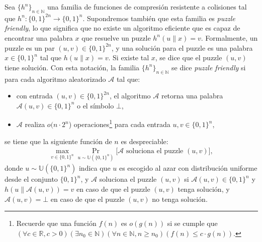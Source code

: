 
Sea $\{h^n\}_{n \in \mathbb{N}}$ una familia de funciones de
compresión resistente a colisiones tal que $h^n
: \{0,1\}^{2n} \to \{0,1\}^{n}$. Supondremos también que esta
familia es \textit{puzzle friendly}, lo que significa que no existe un
algoritmo eficiente que es capaz de encontrar una palabra $x$ que resuelve un puzzle
$h^n(u \| x) = v$. Formalmente, un puzzle es un par $(u, v) \in \{0,1\}^{2n}$, y una solución para el puzzle es una palabra $x \in \{0, 1\}^n$ tal que $h(u \| x) = v$. Si existe tal $x$, se dice que el puzzle $(u,v)$ tiene solución. Con esta notación, la familia
$\{h^n\}_{n \in \mathbb{N}}$ se dice \textit{puzzle friendly} si para cada
 algoritmo aleatorizado $\mathcal{A}$ tal que:
\begin{itemize}
\item con entrada $(u, v) \in \{0,1\}^{2n}$, el algoritmo $\mathcal{A}$ retorna una palabra $\mathcal{A}(u, v) \in \{0,1\}^n$ o el símbolo $\bot$, 

\item $\mathcal{A}$ realiza $o(n \cdot 2^n$) operaciones\footnote{Recuerde que una función $f(n)$ es $o(g(n))$ si se cumple que $(\forall c \in \mathbb{R}, c > 0)(\exists n_0 \in \mathbb{N})(\forall n \in \mathbb{N}, n \geq n_0)(f(n) \leq c \cdot g(n))$.} para cada entrada $u, v \in \{0,1\}^n$,
\end{itemize}
se tiene que la siguiente función de $n$ es despreciable:
\begin{eqnarray*}
\max_{v \in \{0,1\}^n} \Pr_{u \sim \mathbb{U}(\{0,1\}^n)}\big[\mathcal{A} \text{ soluciona el puzzle } (u,v)\big],
\end{eqnarray*}
donde $u \sim \mathbb{U}(\{0,1\}^n)$ indica que $u$ es escogido al azar con distribución uniforme desde el conjunto $\{0,1\}^n$, y $\mathcal{A}$ soluciona el puzzle $(u,v)$ si $\mathcal{A}(u,v) \in \{0,1\}^n$ y $h(u \| \mathcal{A}(u,v)) = v$ en caso de que el puzzle $(u,v)$ tenga solución, y $\mathcal{A}(u,v) = \bot$ en caso de que el puzzle $(u,v)$ no tenga solución.

